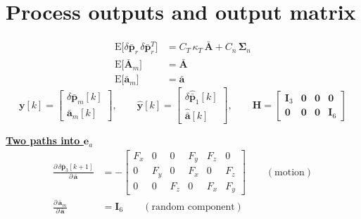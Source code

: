 \documentclass[11pt,a4paper]{ctexart}
\newcommand{\hd}[1]{\par\bigskip\noindent\underline{\textbf{#1}}}
\newcommand{\dpb}{\delta\bar{\mathbf p}}
\newcommand{\dph}{\delta\hat{\bar{\mathbf p}}}
\newcommand{\Ab}{\bar{\mathbf A}}
\newcommand{\av}{\bar{\mathbf a}}
\newcommand{\avh}{\hat{\bar{\mathbf a}}}
\newcommand{\I}{\mathbf I}
\newcommand{\Sn}{\boldsymbol\Sigma_n}
\newcommand{\CK}{C_T\,\kappa_T}
\newcommand{\E}{\mathrm{E}}
\begin{document}
\clearpage
\section{Process outputs and output matrix}
\begin{align*}
\E\big[\dpb_r\,\dpb_r^{T}\big] &= \CK\,\Ab + C_n\,\Sn \\
\E\big[\Ab_m\big] &= \Ab \\
\E\big[\av_m\big] &= \av
\end{align*}
\[
\mathbf y[k] = \begin{bmatrix} \dpb_m[k] \\ \av_m[k] \end{bmatrix},
\qquad
\hat{\mathbf y}[k] = \begin{bmatrix} \dph_1[k] \\ \avh[k] \end{bmatrix},
\qquad
\mathbf H =
\begin{bmatrix}
\I_3 & \mathbf 0 & \mathbf 0 & \mathbf 0 \\
\mathbf 0 & \mathbf 0 & \mathbf 0 & \I_6
\end{bmatrix}
\]

\hd{Two paths into $\mathbf e_a$}
\begin{align*}
\frac{\partial\,\dpb_3[k+1]}{\partial\,\av} &= -\begin{bmatrix}
F_x & 0 & 0 & F_y & F_z & 0 \\
0 & F_y & 0 & F_x & 0 & F_z \\
0 & 0 & F_z & 0 & F_x & F_y
\end{bmatrix} \qquad (\text{motion}) \\
\frac{\partial\,\av_m}{\partial\,\av} &= \I_6 \qquad (\text{random component})
\end{align*}

\clearpage
\end{document}
